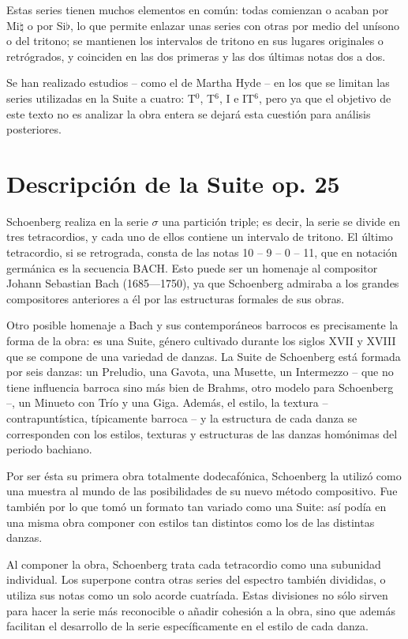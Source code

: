 		Estas series tienen muchos elementos en común: todas comienzan o acaban por Mi$\natural$ o por Si$\flat$, lo que permite enlazar unas series con otras por medio del unísono o del tritono; se mantienen los intervalos de tritono en sus lugares originales o retrógrados, y coinciden en las dos primeras y las dos últimas notas dos a dos.
		
		Se han realizado estudios -- como el de Martha Hyde \cite{hyde} -- en los que se limitan las series utilizadas en la Suite a cuatro: T$^0$, T$^6$, I e IT$^6$, pero ya que el objetivo de este texto no es analizar la obra entera se dejará esta cuestión para análisis posteriores.
		
	\section{Descripción de la Suite op. 25}
		Schoenberg realiza en la serie $\sigma$ una partición triple; es decir, la serie se divide en tres tetracordios, y cada uno de ellos contiene un intervalo de tritono. El último tetracordio, si se retrograda, consta de las notas 10 -- 9 -- 0 -- 11, que en notación germánica es la secuencia BACH. Esto puede ser un homenaje al compositor Johann Sebastian Bach (1685—1750), ya que Schoenberg admiraba a los grandes compositores anteriores a él por las estructuras formales de sus obras. \cite{xiao}
		
		Otro posible homenaje a Bach y sus contemporáneos barrocos es precisamente la forma de la obra: es una Suite, género cultivado durante los siglos XVII y XVIII que se compone de una variedad de danzas. La Suite de Schoenberg está formada por seis danzas: un Preludio, una Gavota, una Musette, un Intermezzo -- que no tiene influencia barroca sino más bien de Brahms, otro modelo para Schoenberg --, un Minueto con Trío y una Giga. Además, el estilo, la textura -- contrapuntística, típicamente barroca -- y la estructura de cada danza se corresponden con los estilos, texturas y estructuras de las danzas homónimas del periodo bachiano.
        
        Por ser ésta su primera obra totalmente dodecafónica, Schoenberg la utilizó como una muestra al mundo de las posibilidades de su nuevo método compositivo. Fue también por lo que tomó un formato tan variado como una Suite: así podía en una misma obra componer con estilos tan distintos como los de las distintas danzas.
        
        Al componer la obra, Schoenberg trata cada tetracordio como una subunidad individual. Los superpone contra otras series del espectro también divididas, o utiliza sus notas como un solo acorde cuatríada. Estas divisiones no sólo sirven para hacer la serie más reconocible o añadir cohesión a la obra, sino que además facilitan el desarrollo de la serie específicamente en el estilo de cada danza.
		
